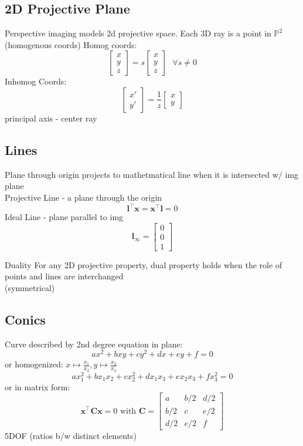 \documentclass{article}
\begin{document}
\subsection{2D Projective Plane}
Perspective imaging models 2d projective space. Each 3D ray is a point in $\mathbb P^2$ (homogenous coords)
Homog coords:
\[
    \begin{bmatrix}
        x \\ y \\ z
    \end{bmatrix} = s \begin{bmatrix}
        x \\ y \\ z
    \end{bmatrix} \ \ \ \forall s \ne 0
\]
Inhomog Coords:
\[
    \begin{bmatrix}
        x' \\ y' 
    \end{bmatrix} = \frac{1}{z}
    \begin{bmatrix}
        x \\ y
    \end{bmatrix}
\]
principal axis - center ray 

\subsection{Lines}
Plane through origin projects to mathetmatical line when it is intersected w/ img plane
\\
Projective Line - a plane through the origin
\[
    \mathbf l ^\top \mathbf x = \mathbf x ^\top \mathbf l = 0
\]
Ideal Line - plane parallel to img
\[
    \mathbf l_\infty = \begin{bmatrix}
        0 \\ 0\\ 1
    \end{bmatrix}
\]
\begin{expln}
    {Duality}{}
    For any 2D projective property, dual property holds when the role of points 
    and lines are interchanged \\
    (symmetrical)
\end{expln}
\pagebreak
\subsection{Conics}
Curve described by 2nd degree equation in plane:
\[
    ax^2 +bxy + cy^2 + dx +ey +f = 0
\]
or homogenized: $x\mapsto \frac{x_1}{x_3}, y\mapsto \frac{x_2}{x_3}$
\[
    ax_1^2 + bx_1x_2+cx_2^2+dx_1x_3+ex_2x_3 + fx_3^2 = 0
\] or in matrix form:
\[
    \mathbf x^\top \mathbf C \mathbf x = 0 \text{ with } \mathbf C =\begin{bmatrix}
        a & b/2 & d/2 \\
        b/2 & c & e/2 \\
        d/2 & e/2 & f
    \end{bmatrix} 
\]
5DOF (ratios b/w distinct elements)
\end{document}
